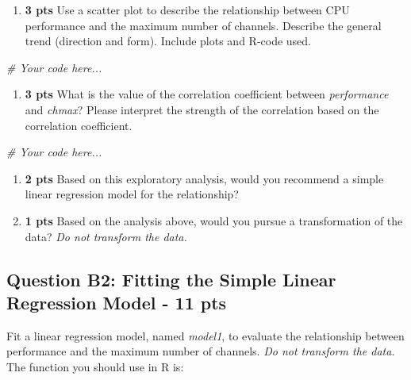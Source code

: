 \documentclass[
]{article}
\newenvironment{Shaded}{\begin{snugshade}}{\end{snugshade}}
\newcommand{\CommentTok}[1]{\textcolor[rgb]{0.56,0.35,0.01}{\textit{#1}}}
\providecommand{\tightlist}{%
  \setlength{\itemsep}{0pt}\setlength{\parskip}{0pt}}
\begin{document}
\begin{enumerate}
\def\labelenumi{\alph{enumi}.}
\tightlist
\item
  \textbf{3 pts} Use a scatter plot to describe the relationship between
  CPU performance and the maximum number of channels. Describe the
  general trend (direction and form). Include plots and R-code used.
\end{enumerate}

\begin{Shaded}
\begin{Highlighting}[]
\CommentTok{\# Your code here...}
\end{Highlighting}
\end{Shaded}

\begin{enumerate}
\def\labelenumi{\alph{enumi}.}
\setcounter{enumi}{1}
\tightlist
\item
  \textbf{3 pts} What is the value of the correlation coefficient
  between \emph{performance} and \emph{chmax}? Please interpret the
  strength of the correlation based on the correlation coefficient.
\end{enumerate}

\begin{Shaded}
\begin{Highlighting}[]
\CommentTok{\# Your code here...}
\end{Highlighting}
\end{Shaded}

\begin{enumerate}
\def\labelenumi{\alph{enumi}.}
\setcounter{enumi}{2}
\item
  \textbf{2 pts} Based on this exploratory analysis, would you recommend
  a simple linear regression model for the relationship?
\item
  \textbf{1 pts} Based on the analysis above, would you pursue a
  transformation of the data? \emph{Do not transform the data.}
\end{enumerate}

\hypertarget{question-b2-fitting-the-simple-linear-regression-model---11-pts}{%
\subsection{Question B2: Fitting the Simple Linear Regression Model - 11
pts}\label{question-b2-fitting-the-simple-linear-regression-model---11-pts}}

Fit a linear regression model, named \emph{model1}, to evaluate the
relationship between performance and the maximum number of channels.
\emph{Do not transform the data.} The function you should use in R is:
\end{document}
